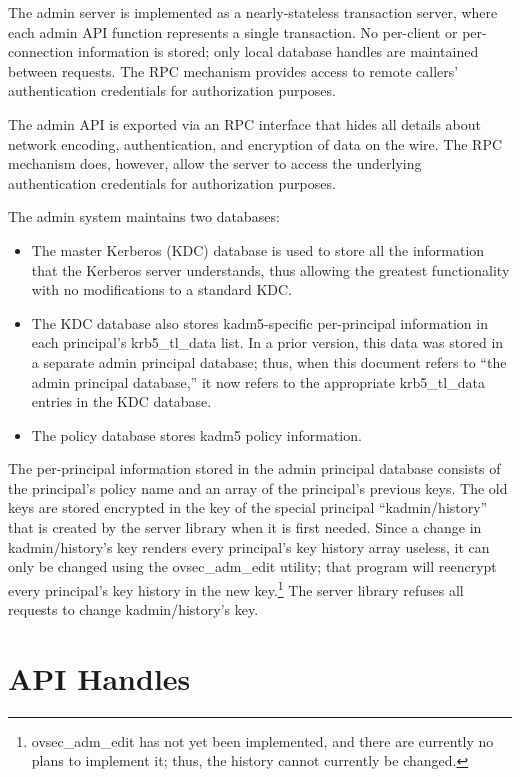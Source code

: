 The admin server is implemented as a nearly-stateless transaction
server, where each admin API function represents a single transaction.
No per-client or per-connection information is stored; only local
database handles are maintained between requests.  The RPC mechanism
provides access to remote callers' authentication credentials for
authorization purposes.

The admin API is exported via an RPC interface that hides all details
about network encoding, authentication, and encryption of data on the
wire.  The RPC mechanism does, however, allow the server to access the
underlying authentication credentials for authorization purposes.

The admin system maintains two databases:
%
\begin{itemize}
\item The master Kerberos (KDC) database is used to store all the
information that the Kerberos server understands, thus allowing the
greatest functionality with no modifications to a standard KDC.

\item The KDC database also stores kadm5-specific per-principal
information in each principal's krb5_tl_data list.  In a prior
version, this data was stored in a separate admin principal database;
thus, when this document refers to ``the admin principal database,''
it now refers to the appropriate krb5_tl_data entries in the KDC
database.

\item The policy database stores kadm5 policy information.
\end{itemize}

The per-principal information stored in the admin principal database
consists of the principal's policy name and an array of the
principal's previous keys.  The old keys are stored encrypted in the
key of the special principal ``kadmin/history'' that is created by the
server library when it is first needed.  Since a change in
kadmin/history's key renders every principal's key history array
useless, it can only be changed using the ovsec_adm_edit utility; that
program will reencrypt every principal's key history in the new
key.\footnote{ovsec_adm_edit has not yet been implemented, and there
are currently no plans to implement it; thus, the history cannot
currently be changed.}  The server library refuses all requests to
change kadmin/history's key.

\section{API Handles}

